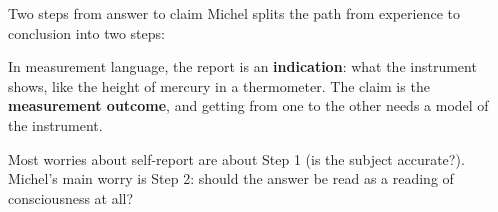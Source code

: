 \documentclass[aspectratio=169,11pt]{beamer}
\begin{document}
\begin{frame}[label=twosteps]{Two steps from answer to claim}
Michel splits the path from experience to conclusion into two steps:

\vspace{0.6em}
\begin{center}
\end{center}

\vspace{0.6em}
In measurement language, the report is an \textbf{\textcolor{report}{indication}}: what the instrument shows, like the height of mercury in a thermometer.
The claim is the \textbf{measurement outcome}, and getting from one to the other needs a model of the instrument.

\vspace{0.4em}
{\small Most worries about self-report are about Step 1 (is the subject accurate?). Michel's main worry is Step 2: should the answer be read as a reading of consciousness at all?}
\end{frame}
\end{document}
